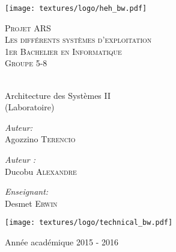 \begin{center}
  \texttt{[image: textures/logo/heh\_bw.pdf]}

  \vspace{2cm}

  \textsc{\LARGE Projet ARS} \\ [0.5cm]
  \textsc{\Large Les différents systèmes d'exploitation} \\ [0.5cm]

  \textsc{\large 1er Bachelier en Informatique} \\ [0.2cm]
  \textsc{Groupe 5-8} \\

  \begingroup
   \selectfont 

  \HRule \\ [0.4cm] {
    \huge Architecture des Systèmes II \\ [0.2cm] 
  }
  (Laboratoire)
  \HRule \\ [1.3cm]
  \endgroup

  \begin{minipage}[t]{0.4 \textwidth} 
    \begin{flushleft} 
      \large \emph{Auteur:} \\ 
      Agozzino \textsc{Terencio} 
    \end{flushleft} 
  \end{minipage}
  \begin{minipage}[t]{0.4 \textwidth}
    \begin{flushright} 
      \large \emph{Auteur :} \\ 
      Ducobu \textsc{Alexandre} 
    \end{flushright} 
  \end{minipage}

  \vspace{0.5cm}

  \begin{minipage}[t]{0.4 \textwidth}
    \begin{center} 
      \large \emph{Enseignant:} \\ 
      Desmet \textsc{Erwin} 
    \end{center} 
  \end{minipage}

  \vspace{0.5cm}

  \texttt{[image: textures/logo/technical\_bw.pdf]}

  \vspace{0.5cm}

  Année académique 2015 - 2016
\end{center}

\thispagestyle{empty}

